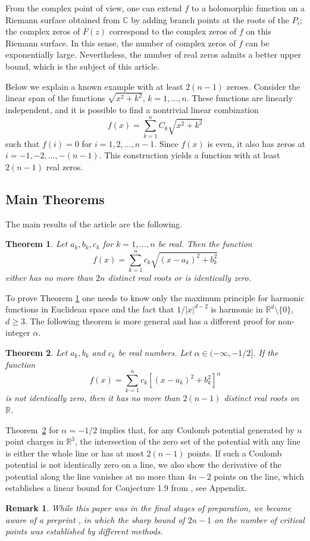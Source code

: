 \documentclass{article}
\newcommand{\R}{\mathbb{R}}
\newtheorem{theorem}{Theorem}[section]
\newtheorem{remark}{Remark}[section]
\begin{document}
From the complex point of view, one can extend $f$ to a holomorphic function on a Riemann surface obtained from $\mathbb{C}$ by adding branch points at the roots of the $P_i$; the complex zeros of $F(z)$ correspond to the complex zeros of $f$ on this Riemann surface. In this sense, the number of complex zeros of $f$ can be exponentially large. Nevertheless, the number of real zeros admits a better upper bound, which is the subject of this article.

Below we explain a known example with at least $2(n-1)$ zeroes. Consider the linear span of the functions $\sqrt{x^{2}+k^{2}}$, $k=1,\dots,n$. These functions are linearly independent, and it is possible to find a nontrivial linear combination
\[
f(x)=\sum_{k=1}^{n} C_{k}\sqrt{x^{2}+k^{2}}
\]
such that $f(i)=0$ for $i=1,2,\dots,n-1$. Since $f(x)$ is even, it also has zeros at $i=-1,-2,\dots,-(n-1)$. This construction yields a function with at least $2(n-1)$ real zeros.


\subsection*{Main Theorems}
The main results of the article are the following.

\begin{theorem} \label{Main 1}
Let $a_k, b_k, c_k$ for $k=1, \dots, n$ be real. Then the function
\[
f(x)=\sum_{k=1}^{n}c_{k}\sqrt{(x-a_{k})^{2}+b_{k}^{2}}
\]
either has no more than $2n$ distinct real roots or is identically zero. 
\end{theorem}

To prove Theorem \ref{Main 1} one needs to know only the maximum principle for harmonic functions in Euclidean space and the fact that $1/|x|^{d-2}$ is harmonic in $\mathbb{R}^d\setminus{\{0\}}$, $d\geq 3$. The following theorem is more general and has a different proof for non-integer $\alpha$.

\begin{theorem} \label{Main 2}
Let $a_k, b_k$ and $c_k$ be real numbers.  Let $\alpha \in (-\infty, -1/2]$. If the function
\[
f(x)=\sum_{k=1}^{n}c_{k}[(x-a_{k})^{2}+b_{k}^{2}]^{\alpha}
\]
is not identically zero, then it has no more than $2(n-1)$ distinct real roots on $\R$.
\end{theorem}


Theorem~\ref{Main 2} for $\alpha=-1/2$  implies that, for any Coulomb  potential generated by $n$ point charges in $\mathbb{R}^3$, the intersection of the zero set of the potential with any line is either the whole line or has at most $2(n-1)$ points.
If such a Coulomb potential is not identically zero on a line, we also show the derivative of the potential along the line vanishes at no more than $4n-2$ points on the line, which establishes a linear bound for Conjecture 1.9 from \cite{GNS}, see Appendix.
\begin{remark}
    While this paper was in the final stages of preparation, we became aware of a preprint \cite{Oliveira}, in which the sharp bound of $2n-1$ on the number of critical points was established by different methods.
\end{remark}
\end{document}

